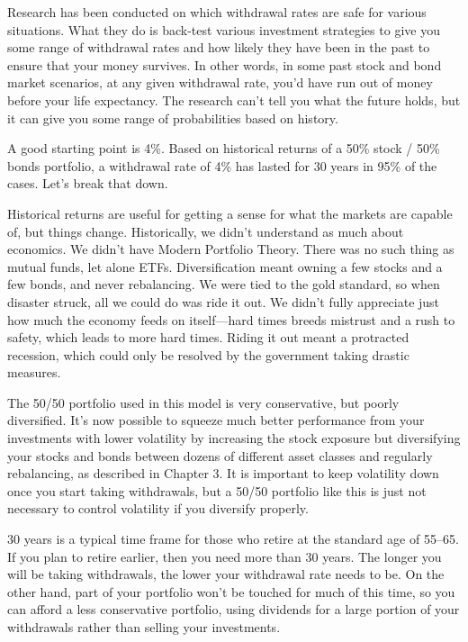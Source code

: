 Research has been conducted on which withdrawal rates are safe for various situations.\cite{trinity-study} What they do is back-test various investment strategies to give you some range of withdrawal rates and how likely they have been in the past to ensure that your money survives. In other words, in some past stock and bond market scenarios, at any given withdrawal rate, you'd have run out of money before your life expectancy. The research can't tell you what the future holds, but it can give you some range of probabilities based on history.

A good starting point is 4\%. Based on historical returns of a 50\% stock / 50\% bonds portfolio, a withdrawal rate of 4\% has lasted for 30 years in 95\% of the cases.\cite{trinity-study} Let's break that down.

Historical returns are useful for getting a sense for what the markets are capable of, but things change. Historically, we didn't understand as much about economics. We didn't have Modern Portfolio Theory. There was no such thing as mutual funds, let alone ETFs. Diversification meant owning a few stocks and a few bonds, and never rebalancing. We were tied to the gold standard, so when disaster struck, all we could do was ride it out. We didn't fully appreciate just how much the economy feeds on itself---hard times breeds mistrust and a rush to safety, which leads to more hard times. Riding it out meant a protracted recession, which could only be resolved by the government taking drastic measures.

The 50/50 portfolio used in this model is very conservative, but poorly diversified. It's now possible to squeeze much better performance from your investments with lower volatility by increasing the stock exposure but diversifying your stocks and bonds between dozens of different asset classes and regularly rebalancing, as described in Chapter 3. It is important to keep volatility down once you start taking withdrawals, but a 50/50 portfolio like this is just not necessary to control volatility if you diversify properly.

30 years is a typical time frame for those who retire at the standard age of 55--65. If you plan to retire earlier, then you need more than 30 years. The longer you will be taking withdrawals, the lower your withdrawal rate needs to be. On the other hand, part of your portfolio won't be touched for much of this time, so you can afford a less conservative portfolio, using dividends for a large portion of your withdrawals rather than selling your investments.

